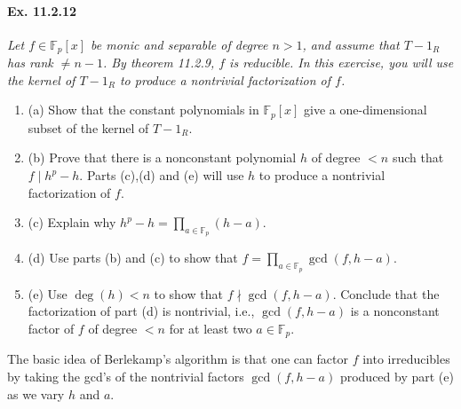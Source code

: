 \documentclass[11pt,a4paper]{article}
\newcommand{\be} {\begin{enumerate}}
\newcommand{\ee} {\end{enumerate}}
\newcommand{\F}{\mathbb{F}}
\begin{document}
\paragraph{Ex. 11.2.12}

{\it Let $f \in \F_p[x]$ be monic and separable of degree $n>1$, and assume that $T-1_R$ has rank $\neq n-1$. By theorem 11.2.9, $f$ is reducible. In this exercise, you will use the kernel of $T-1_R$ to produce a nontrivial factorization of $f$.
\be
\item[(a)] Show that the constant polynomials in $\F_p[x]$ give a one-dimensional subset of the kernel of $T-1_R$.
\item[(b)] Prove that there is a nonconstant polynomial $h$ of degree $<n$ such that $f \mid h^p - h$. Parts (c),(d) and (e) will use $h$ to produce a nontrivial factorization of $f$.

\item[(c)] Explain why $h^p-h = \prod_{a\in \F_p} (h-a)$.
\item[(d)] Use parts (b) and (c) to show that $f = \prod_{a\in \F_p} \gcd(f,h-a)$.
\item[(e)] Use $\deg(h)<n$ to show that $f \nmid \gcd(f,h-a)$. Conclude that the factorization of part (d) is nontrivial, i.e., $\gcd(f,h-a)$ is a nonconstant factor of $f$ of degree $<n$ for at least two $a \in \F_p$.
\ee
The basic idea of Berlekamp's algorithm is that one can factor $f$ into irreducibles by taking the gcd's of the nontrivial factors $\gcd(f,h-a)$ produced by part (e) as we vary $h$ and $a$.
}
\end{document}
